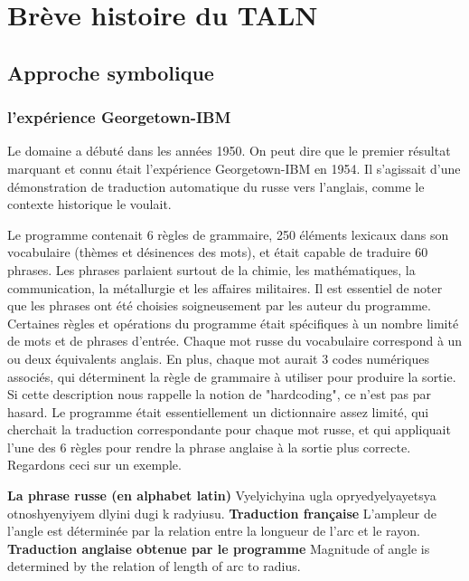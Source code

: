 \documentclass[11pt, a4paper]{report}
\begin{document}
\chapter{Brève histoire du TALN}
  \section*{Approche symbolique}
    \subsection*{l'expérience Georgetown-IBM}
Le domaine a débuté dans les années 1950. On peut dire que le premier résultat 
marquant et connu était l'expérience Georgetown-IBM en 1954. Il s'agissait d'une 
démonstration de traduction automatique du russe vers l'anglais, comme le 
contexte historique le voulait.

Le programme contenait 6 règles de grammaire, 250 éléments lexicaux dans son 
vocabulaire (thèmes et désinences des mots), et était capable de traduire 60 
phrases. Les phrases parlaient surtout de la chimie, les mathématiques, la 
communication, la métallurgie et les affaires militaires. Il est essentiel de 
noter que les phrases ont été choisies soigneusement par les auteur du programme. 
Certaines règles et opérations du programme était spécifiques à un nombre limité 
de mots et de phrases d'entrée. Chaque mot russe du vocabulaire correspond à un ou deux 
équivalents anglais. En plus, chaque mot aurait 3 codes numériques associés, qui 
déterminent la règle de grammaire à utiliser pour produire la sortie. 
Si cette description nous rappelle la notion de 
"hardcoding", ce n'est pas par hasard. Le programme était essentiellement un 
dictionnaire assez limité, qui cherchait la traduction correspondante pour chaque 
mot russe, et qui appliquait l'une des 6 règles pour rendre la phrase anglaise 
à la sortie plus correcte. Regardons ceci sur un exemple. 

\noindent \textbf{La phrase russe (en alphabet latin)} \newline 
Vyelyichyina ugla opryedyelyayetsya otnoshyenyiyem dlyini dugi k radyiusu. \newline  
\textbf{Traduction française} \newline 
L'ampleur de l'angle est déterminée par la relation entre la longueur de l'arc et le rayon. \newline 
\textbf{Traduction anglaise obtenue par le programme} \newline 
Magnitude of angle is determined by the relation of length of arc to radius.
\end{document}
